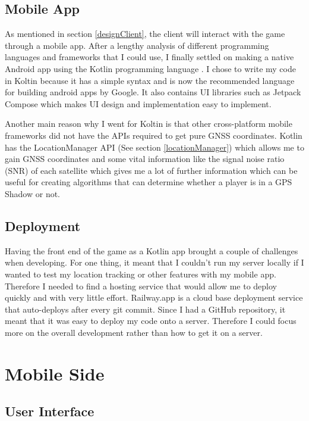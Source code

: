 \documentclass{l4proj}
\begin{document}
\subsection{Mobile App}
As mentioned in section \ref{designClient}, the client will interact with the game through a mobile app. After a lengthy
analysis of different programming languages and frameworks that I could use, I finally settled on making a native Android
app using the Kotlin programming language \citep{kotlin}. I chose to write my code in Koltin because it has a simple syntax
and is now the recommended language for building android apps by Google. It also contains UI libraries such as Jetpack Compose 
which makes UI design and implementation easy to implement.

Another main reason why I went for Koltin is that other cross-platform mobile frameworks did not have the APIs required
to get pure GNSS coordinates. Kotlin has the LocationManager API (See section \ref{locationManager}) which allows me
to gain GNSS coordinates and some vital information like the signal noise ratio (SNR) of each satellite \citep{locationManager}
which gives me a lot of further information which can be useful for creating algorithms that can determine whether a player
is in a GPS Shadow or not.

\subsection{Deployment}
\label{deployment}
Having the front end of the game as a Kotlin app brought a couple of challenges when developing. For one thing, it meant
that I couldn't run my server locally if I wanted to test my location tracking or other features with my mobile app. Therefore
I needed to find a hosting service that would allow me to deploy quickly and with very little effort. Railway.app \citep{railway}
is a cloud base deployment service that auto-deploys after every git commit. Since I had a GitHub repository, it meant that it was
easy to deploy my code onto a server. Therefore I could focus more on the overall development rather than how to get it on a server.

\section{Mobile Side}

\subsection{User Interface}
\label{implementationui}
\end{document}
